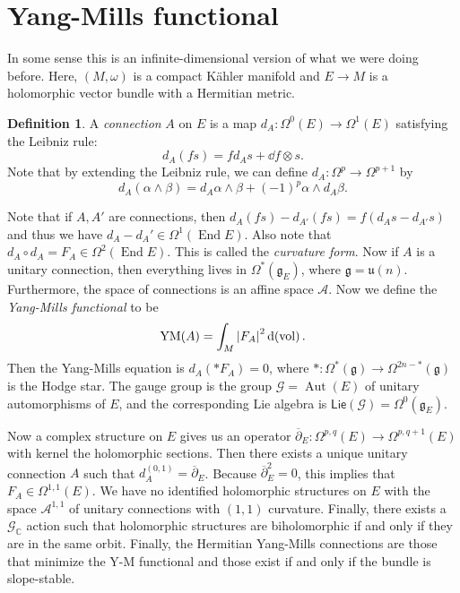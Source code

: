 \documentclass[leqno, openany]{memoir}
\theoremstyle{definition}
\newtheorem{defn}[thm]{Definition}
\theoremstyle{remark}
\theoremstyle{plain}
\theoremstyle{definition}
\theoremstyle{remark}
\newcommand{\C}{\mathbb{C}}
\newcommand{\mc}[1]{\mathcal{#1}}
\newcommand{\mf}[1]{\mathfrak{#1}}
\newcommand{\mr}[1]{\mathrm{#1}}
\newcommand{\ms}[1]{\mathsf{#1}}
\newcommand{\ol}[1]{\overline{#1}}
\DeclareMathOperator{\End}{End}
\DeclareMathOperator{\Aut}{Aut}
\begin{document}
\section{Yang-Mills functional}%
\label{sec:yang_mills_functional}

In some sense this is an infinite-dimensional version of what we were doing before. Here, $(M, \omega)$ is a compact K\"ahler manifold and $E \to M$ is a holomorphic vector bundle with a Hermitian metric.

\begin{defn}
    A \textit{connection} $A$ on $E$ is a map $d_A \colon \Omega^0(E) \to \Omega^1(E)$ satisfying the Leibniz rule:
    \[ d_A(f s) = f d_A s + \dd{f} \otimes s. \]
    Note that by extending the Leibniz rule, we can define $d_A \colon \Omega^p \to \Omega^{p+1}$ by
    \[ d_A(\alpha \wedge \beta) = d_A \alpha \wedge \beta + (-1)^p \alpha \wedge d_A \beta. \]
\end{defn}

Note that if $A, A'$ are connections, then $d_A(fs) - d_{A'}(fs) = f(d_A s - d_{A'} s)$ and thus we have $d_A - d_A' \in \Omega^1(\End E)$. Also note that $d_A \circ d_A = F_A \in \Omega^2(\End E)$. This is called the \textit{curvature form}. Now if $A$ is a unitary connection, then everything lives in $\Omega^*(\mf{g}_E)$, where $\mf{g} = \mf{u}(n)$. Furthermore, the space of connections is an affine space $\mc{A}$. Now we define the \textit{Yang-Mills functional} to be
\[ \mr{YM}(A) = \int_M \abs{F_A}^2 \dd{\mr{(vol)}}. \]
Then the Yang-Mills equation is $d_A(* F_A) = 0$, where $* \colon \Omega^*(\mf{g}) \to \Omega^{2n-*}(\mf{g})$ is the Hodge star. The gauge group is the group $\mc{G} = \Aut(E)$ of unitary automorphisms of $E$, and the corresponding Lie algebra is $\ms{Lie}(\mc{G}) = \Omega^0(\mf{g}_E)$.

Now a complex structure on $E$ gives us an operator $\ol{\partial}_E \colon \Omega^{p,q}(E) \to \Omega^{p,q+1}(E)$ with kernel the holomorphic sections. Then there exists a unique unitary connection $A$ such that $d_A^{(0,1)} = \ol{\partial}_E$. Because $\ol{\partial}_E^2 = 0$, this implies that $F_A \in \Omega^{1,1}(E)$. We have no identified holomorphic structures on $E$ with the space $\mc{A}^{1,1}$ of unitary connections with $(1,1)$ curvature. Finally, there exists a $\mc{G}_{\C}$ action such that holomorphic structures are biholomorphic if and only if they are in the same orbit. Finally, the Hermitian Yang-Mills connections are those that minimize the Y-M functional and those exist if and only if the bundle is slope-stable.
\end{document}
